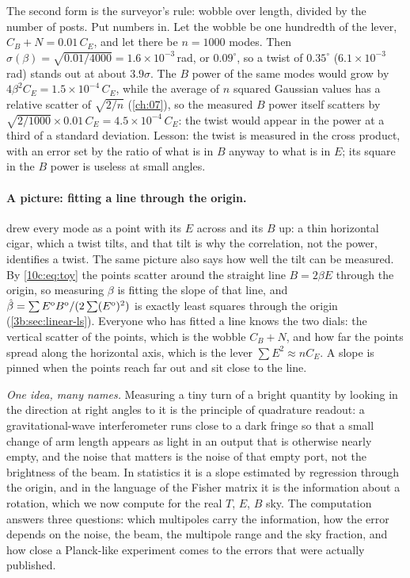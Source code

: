 The second form is the surveyor's rule: wobble over length, divided by the number of posts. Put numbers in. Let
the wobble be one hundredth of the lever, $C_B+N=0.01\,C_E$, and let there be $n=1000$ modes. Then
$\sigma(\beta)=\sqrt{0.01/4000}=1.6\times10^{-3}$\,rad, or $0.09^\circ$, so a twist of $0.35^\circ$
($6.1\times10^{-3}$\,rad) stands out at about $3.9\sigma$. The $B$ power of the same modes would grow by
$4\beta^2C_E=1.5\times10^{-4}\,C_E$, while the average of $n$ squared Gaussian values has a relative scatter of
$\sqrt{2/n}$ (\cref{ch:07}), so the measured $B$ power itself scatters by $\sqrt{2/1000}\times0.01\,C_E=4.5\times10^{-4}\,C_E$: the
twist would appear in the power at a third of a standard deviation. Lesson: the twist is measured in the cross
product, with an error set by the ratio of what is in $B$ anyway to what is in $E$; its square in the $B$ power is
useless at small angles.

\paragraph{A picture: fitting a line through the origin.}  drew every mode as a point
with its $E$ across and its $B$ up: a thin horizontal cigar, which a twist tilts, and that tilt is why the
correlation, not the power, identifies a twist. The same picture also says how well the tilt can be measured.
By \eqref{10c:eq:toy} the points scatter around the straight line $B=2\beta E$ through the origin, so measuring
$\beta$ is fitting the slope of that line, and $\hat\beta=\sum E^{\rm o}B^{\rm o}/(2\sum
(E^{\rm o})^2)$ is exactly least squares through the origin (\cref{3b:sec:linear-ls}). Everyone who has fitted a
line knows the two dials: the vertical scatter of the points, which is the wobble $C_B+N$, and how far the points
spread along the horizontal axis, which is the lever $\sum E^2\approx nC_E$. A slope is pinned when the points
reach far out and sit close to the line.

\emph{One idea, many names.} Measuring a tiny turn of a bright quantity by looking in the direction at right
angles to it is the principle of quadrature readout: a gravitational-wave interferometer runs close to a dark
fringe so that a small change of arm length appears as light in an output that is otherwise nearly empty, and the
noise that matters is the noise of that empty port, not the brightness of the beam. In statistics it is a slope
estimated by regression through the origin, and in the language of the Fisher matrix it is the information about
a rotation, which we now compute for the real $T$, $E$, $B$ sky. The computation answers three questions: which
multipoles carry the information, how the error depends on the noise, the beam, the multipole range and the sky
fraction, and how close a Planck-like experiment comes to the errors that were actually published.

